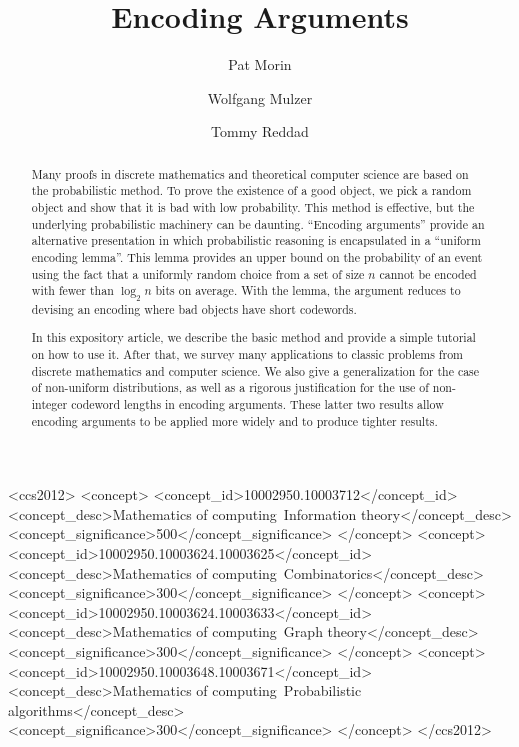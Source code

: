 \documentclass[format=acmsmall, review=false, screen=true]{acmart}
\begin{document}
\title[Encoding Arguments]{Encoding Arguments}

\author{Pat Morin}
\author{Wolfgang Mulzer}
\author{Tommy Reddad}


\begin{abstract}

  Many proofs in discrete mathematics and theoretical computer  science
  are based on the probabilistic method. To prove the existence of a
  good object, we pick a random object and show that it is bad with low
  probability. This method is effective, but the underlying probabilistic
  machinery can be daunting. ``Encoding arguments'' provide an alternative
  presentation in which probabilistic reasoning is encapsulated in a
  ``uniform encoding lemma''. This lemma provides an upper bound on the
  probability of an event using the fact that a uniformly random choice
  from a set of size $n$ cannot be encoded with fewer than $\log_2 n$
  bits on average. With the lemma, the argument reduces to devising an
  encoding where bad objects have short codewords.

  In this expository article, we describe the basic method and
  provide a simple tutorial on how to use it. After that, we survey
  many applications to classic problems from discrete mathematics
  and computer science. We also give a generalization for the case
  of non-uniform distributions, as well as a rigorous justification
  for the use of non-integer codeword lengths in encoding arguments.
  These latter two results allow encoding arguments to be applied more
  widely and to produce tighter results.
\end{abstract}

\begin{CCSXML}
<ccs2012>
<concept>
<concept_id>10002950.10003712</concept_id>
<concept_desc>Mathematics of computing~Information theory</concept_desc>
<concept_significance>500</concept_significance>
</concept>
<concept>
<concept_id>10002950.10003624.10003625</concept_id>
<concept_desc>Mathematics of computing~Combinatorics</concept_desc>
<concept_significance>300</concept_significance>
</concept>
<concept>
<concept_id>10002950.10003624.10003633</concept_id>
<concept_desc>Mathematics of computing~Graph theory</concept_desc>
<concept_significance>300</concept_significance>
</concept>
<concept>
<concept_id>10002950.10003648.10003671</concept_id>
<concept_desc>Mathematics of computing~Probabilistic algorithms</concept_desc>
<concept_significance>300</concept_significance>
</concept>
</ccs2012>
\end{CCSXML}
\end{document}
